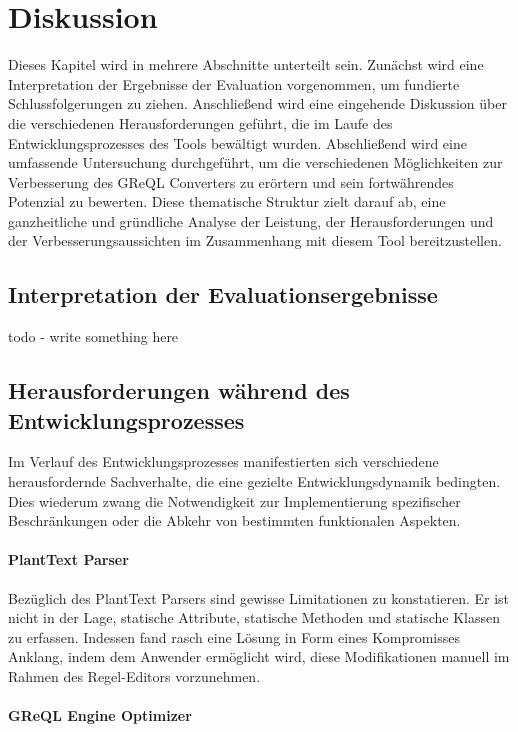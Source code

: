 \chapter{Diskussion}

Dieses Kapitel wird in mehrere Abschnitte unterteilt sein. Zunächst wird eine Interpretation der Ergebnisse der
Evaluation vorgenommen, um fundierte Schlussfolgerungen zu ziehen. Anschließend wird eine eingehende Diskussion über
die verschiedenen Herausforderungen geführt, die im Laufe des Entwicklungsprozesses des Tools bewältigt wurden.
Abschließend wird eine umfassende Untersuchung durchgeführt, um die verschiedenen Möglichkeiten zur Verbesserung des
GReQL Converters zu erörtern und sein fortwährendes Potenzial zu bewerten. Diese thematische Struktur zielt darauf ab,
eine ganzheitliche und gründliche Analyse der Leistung, der Herausforderungen und der Verbesserungsaussichten im
Zusammenhang mit diesem Tool bereitzustellen.

\section{Interpretation der Evaluationsergebnisse}
todo - write something here

\section{Herausforderungen während des Entwicklungsprozesses}

Im Verlauf des Entwicklungsprozesses manifestierten sich verschiedene herausfordernde Sachverhalte, die eine gezielte
Entwicklungsdynamik bedingten. Dies wiederum zwang die Notwendigkeit zur Implementierung spezifischer Beschränkungen
oder die Abkehr von bestimmten funktionalen Aspekten.

\subsubsection{PlantText Parser}

Bezüglich des PlantText Parsers sind gewisse Limitationen zu konstatieren. Er ist nicht in der Lage, statische
Attribute, statische Methoden und statische Klassen zu erfassen. Indessen fand rasch eine Lösung in Form eines
Kompromisses Anklang, indem dem Anwender ermöglicht wird, diese Modifikationen manuell im Rahmen des Regel-Editors
vorzunehmen.

\subsubsection{GReQL Engine Optimizer}

